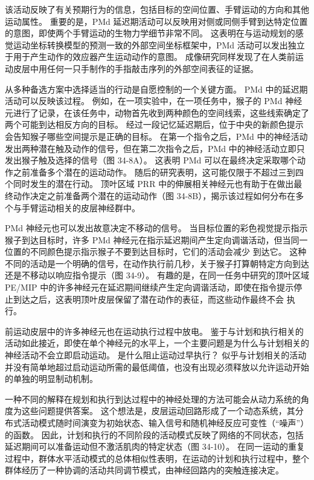 该活动反映了有关预期行为的信息，包括目标的空间位置、手臂运动的方向和其他运动属性。 重要的是，PMd 延迟期活动可以反映用对侧或同侧手臂到达特定位置的意图，即使两个手臂运动的生物力学细节非常不同。 这表明在与运动规划的感觉运动坐标转换模型的预测一致的外部空间坐标框架中，PMd 活动可以发出独立于用于产生动作的效应器产生运动动作的意图。 成像研究同样发现了在人类前运动皮层中用任何一只手制作的手指敲击序列的外部空间表征的证据。

从多种备选方案中选择适当的行动是自愿控制的一个关键方面。 PMd 中的延迟期活动可以反映该过程。 例如，在一项实验中，在一项任务中，猴子的 PMd 神经元进行了记录，在该任务中，动物首先收到两种颜色的空间线索，这些线索确定了两个可能到达相反方向的目标。 经过一段记忆延迟期后，位于中央的新颜色提示会告知猴子哪些空间提示是正确的目标。 在第一个指令之后，PMd 中的神经活动发出两种潜在触及动作的信号，但在第二次指令之后，PMd 中的神经活动立即只发出猴子触及选择的信号（图 34-8A）。 这表明 PMd 可以在最终决定采取哪个动作之前准备多个潜在的运动动作。 随后的研究表明，这可能仅限于不超过三到四个同时发生的潜在行动。 顶叶区域 PRR 中的伸展相关神经元也有助于在做出最终动作决定之前准备两个潜在的运动动作（图 34-8B），揭示该过程如何分布在多个与手臂运动相关的皮层神经群中。

PMd 神经元也可以发出故意决定不移动的信号。 当目标位置的彩色视觉提示指示猴子到达目标时，许多 PMd 神经元在指示延迟期间产生定向调谐活动，但当同一位置的不同颜色提示指示猴子不要到达目标时，它们的活动会减少 到达它。 这种不同的活动是一个明确的信号，在动作执行前几秒，关于猴子打算朝特定方向到达还是不移动以响应指令提示（图 34-9）。 有趣的是，在同一任务中研究的顶叶区域 PE/MIP 中的许多神经元在延迟期间继续产生定向调谐活动，即使在指令提示停止到达之后，这表明顶叶皮层保留了潜在动作的表征，而这些动作最终不会 执行。

前运动皮层中的许多神经元也在运动执行过程中放电。 鉴于与计划和执行相关的活动如此接近，即使在单个神经元的水平上，一个主要问题是为什么与计划相关的神经活动不会立即启动运动。 是什么阻止运动过早执行？ 似乎与计划相关的活动并没有简单地超过启动运动所需的最低阈值，也没有出现必须释放以允许运动开始的单独的明显制动机制。

一种不同的解释在规划和执行到达过程中的神经处理的方法可能会从动力系统的角度为这些问题提供答案。 这个想法是，皮层运动回路形成了一个动态系统，其分布式活动模式随时间演变为初始状态、输入信号和随机神经反应可变性（“噪声”）的函数。 因此，计划和执行的不同阶段的活动模式反映了网络的不同状态，包括延迟期间可以准备运动但不激活肌肉的特定状态（图 34-10）。 在同一运动的重复过程中，群体水平活动模式的总体相似性表明，在运动的计划和执行过程中，整个群体经历了一种协调的活动共同调节模式，由神经回路内的突触连接决定。


